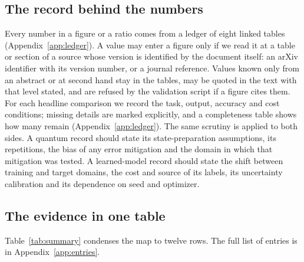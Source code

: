 \documentclass[10pt,a4paper]{article}
\begin{document}
\subsection{The record behind the numbers}
Every number in a figure or a ratio comes from a ledger of eight linked tables (Appendix~\ref{app:ledger}). A value may enter a figure only if we read it at a table or section of a source whose version is identified by the document itself: an arXiv identifier with its version number, or a journal reference. Values known only from an abstract or at second hand stay in the tables, may be quoted in the text with that level stated, and are refused by the validation script if a figure cites them. For each headline comparison we record the task, output, accuracy and cost conditions; missing details are marked explicitly, and a completeness table shows how many remain (Appendix~\ref{app:ledger}). The same scrutiny is applied to both sides. A quantum record should state its state-preparation assumptions, its repetitions, the bias of any error mitigation and the domain in which that mitigation was tested. A learned-model record should state the shift between training and target domains, the cost and source of its labels, its uncertainty calibration and its dependence on seed and optimizer.

\subsection{The evidence in one table}
Table~\ref{tab:summary} condenses the map to twelve rows. The full list of \nEntries{} entries is in Appendix~\ref{app:entries}.
\end{document}
